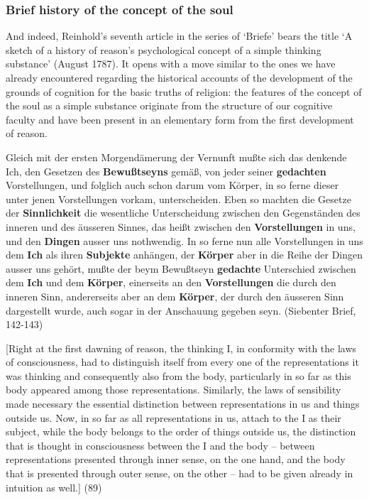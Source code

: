\subsubsection{Brief history of the concept of the soul }


And indeed, Reinhold's seventh article in the series of `Briefe' bears the title `A sketch of a history of reason's psychological concept of a simple thinking substance' (August 1787). It opens with a move similar to the ones we have already encountered regarding the historical accounts of the development of the grounds of cognition for the basic truths of religion: the features of the concept of the soul as a simple substance originate from the structure of our cognitive faculty and have been present in an elementary form from the first development of reason. 

Gleich mit der ersten Morgend\"{a}merung der Vernunft mu\ss{}te sich das denkende Ich, den Gesetzen des \textbf{Bewu\ss{}tseyns} gem\"{a}\ss{}, von jeder seiner \textbf{gedachten }Vorstellungen, und folglich auch schon darum vom K\"{o}rper, in so ferne dieser unter jenen Vorstellungen vorkam, unterscheiden. Eben so machten die Gesetze der \textbf{Sinnlichkeit} die wesentliche Unterscheidung zwischen den Gegenst\"{a}nden des inneren und des \"{a}usseren Sinnes, das hei\ss{}t zwischen den \textbf{Vorstellungen} in uns, und den \textbf{Dingen} ausser uns nothwendig. In so ferne nun alle Vorstellungen in uns dem \textbf{Ich} als ihren \textbf{Subjekte }anh\"{a}ngen, der \textbf{K\"{o}rper} aber in die Reihe der Dingen ausser uns geh\"{o}rt, mu\ss{}te der beym Bewu\ss{}tseyn \textbf{gedachte} Unterschied zwischen dem \textbf{Ich} und dem \textbf{K\"{o}rper}, einerseits an den \textbf{Vorstellungen }die durch den inneren Sinn, andererseits aber an dem \textbf{K\"{o}rper}, der durch den \"{a}usseren Sinn dargestellt wurde, auch sogar in der Anschauung gegeben seyn. (Siebenter Brief, 142{-}143)

[Right at the first dawning of reason, the thinking I, in conformity with the laws of consciousness, had to distinguish itself from every one of the representations it was thinking and consequently also from the body, particularly in so far as this body appeared among those representations. Similarly, the laws of sensibility made necessary the essential distinction between representations in us and things outside us. Now, in so far as all representations in us, attach to the I as their subject, while the body belongs to the order of things outside us, the distinction that is thought in consciousness between the I and the body {--} between representations presented through inner sense, on the one hand, and the body that is presented through outer sense, on the other {--} had to be given already in intuition as well.] (89)

